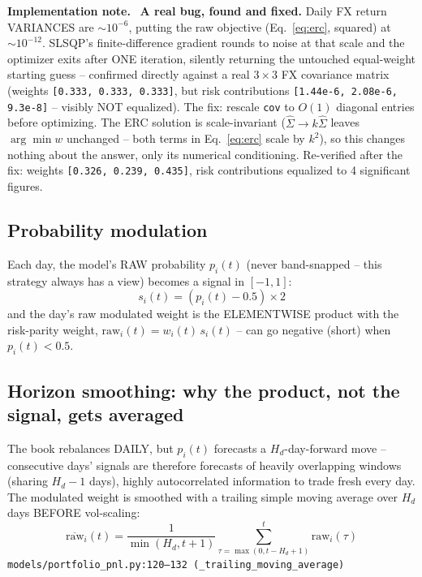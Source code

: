 \documentclass[11pt]{article}
\newcommand{\srcref}[1]{\hfill\textcolor{cmtcolor}{\footnotesize\texttt{#1}}}
\newcommand{\code}[1]{\texttt{\small #1}}
\newcommand{\fixnotelabel}{\small\textbf{Implementation note.}~}
\begin{document}
\begin{fixnote}\fixnotelabel
\textbf{A real bug, found and fixed.} Daily FX return VARIANCES are $\sim 10^{-6}$, putting
the raw objective (Eq.~\ref{eq:erc}, squared) at $\sim 10^{-12}$. SLSQP's finite-difference
gradient rounds to noise at that scale and the optimizer exits after ONE iteration, silently
returning the untouched equal-weight starting guess -- confirmed directly against a real
$3\times 3$ FX covariance matrix (weights \code{[0.333, 0.333, 0.333]}, but risk
contributions \code{[1.44e-6, 2.08e-6, 9.3e-8]} -- visibly NOT equalized). The fix:
rescale \code{cov} to $O(1)$ diagonal entries before optimizing. The ERC solution is
scale-invariant ($\hat\Sigma \to k\hat\Sigma$ leaves $\arg\min w$ unchanged -- both terms in
Eq.~\ref{eq:erc} scale by $k^2$), so this changes nothing about the answer, only its
numerical conditioning. Re-verified after the fix: weights \code{[0.326, 0.239, 0.435]},
risk contributions equalized to 4 significant figures.
\end{fixnote}

\subsection{Probability modulation}

Each day, the model's RAW probability $p_i(t)$ (never band-snapped -- this strategy always
has a view) becomes a signal in $[-1,1]$:
\begin{equation}
  s_i(t) = (p_i(t) - 0.5) \times 2
  \label{eq:signal}
\end{equation}
and the day's raw modulated weight is the ELEMENTWISE product with the risk-parity weight,
$\text{raw}_i(t) = w_i(t)\, s_i(t)$ -- can go negative (short) when $p_i(t) < 0.5$.

\subsection{Horizon smoothing: why the product, not the signal, gets averaged}

The book rebalances DAILY, but $p_i(t)$ forecasts a $H_d$-day-forward move -- consecutive
days' signals are therefore forecasts of heavily overlapping windows (sharing $H_d - 1$
days), highly autocorrelated information to trade fresh every day. The modulated weight is
smoothed with a trailing simple moving average over $H_d$ days BEFORE vol-scaling:
\begin{equation}
  \overline{\text{raw}}_i(t) = \frac{1}{\min(H_d, t+1)} \sum_{\tau=\max(0,t-H_d+1)}^{t} \text{raw}_i(\tau)
  \label{eq:horizonsmooth}
\end{equation}
\srcref{models/portfolio\_pnl.py:120--132 (\texttt{\_trailing\_moving\_average})}
\end{document}
